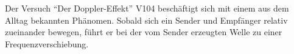  Der Versuch \enquote{Der Doppler-Effekt} V104 beschäftigt sich mit einem aus dem Alltag bekannten Phänomen. Sobald sich ein Sender und Empfänger
 relativ zueinander bewegen, führt er bei der vom Sender erzeugten Welle zu einer Frequenzverschiebung.
